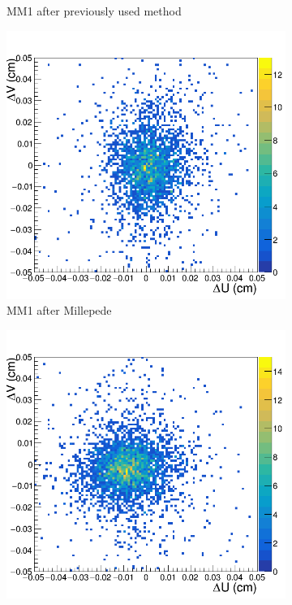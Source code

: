 \begin{figure}[h!]
\begin{subfigure}[l]{.45\textwidth}
   \caption{MM1 after previously used method}
   \label{fig:MX1_after_prev}
 \end{subfigure}
 \begin{subfigure}[r]{.45\textwidth}
   \centering
   \includegraphics[width=\linewidth]{thesis_figures/alignment/Run_3211_after_millepede/square/MX1.png}
   \caption{MM1 after Millepede}
 \end{subfigure}
 \hfill
 \begin{subfigure}[l]{.45\textwidth}
   \centering
   \includegraphics[width=\linewidth]{thesis_figures/alignment/Run_3211_after_prev/square/MX2.png}

\end{subfigure}
\end{figure}
